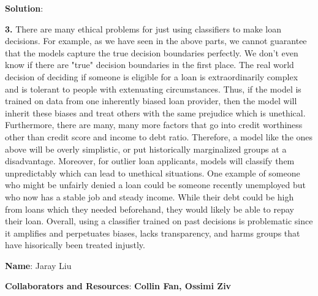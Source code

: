 \documentclass[submit]{../harvardml}
\newenvironment{solution}{
    \vspace{2mm}
    \color{black}\noindent\textbf{Solution}:
}{}
\begin{document}
\begin{solution}
\begin{tcolorbox}
        \textbf{3.} There are many ethical problems for just using classifiers to make loan decisions. For example, as we have seen in the above parts, we cannot guarantee that the models capture the true decision boundaries perfectly. We don't even know if there are "true" decision boundaries in the first place. The real world decision of deciding if someone is eligible for a loan is extraordinarily complex and is tolerant to people with extenuating circumstances. Thus, if the model is trained on data from one inherently biased loan provider, then the model will inherit these biases and treat others with the same prejudice which is unethical. Furthermore, there are many, many more factors that go into credit worthiness other than credit score and income to debt ratio. Therefore, a model like the ones above will be overly simplistic, or put historically marginalized groups at a disadvantage. Moreover, for outlier loan applicants, models will classify them unpredictably which can lead to unethical situations. One example of someone who might be unfairly denied a loan could be someone recently unemployed but who now has a stable job and steady income. While their debt could be high from loans which they needed beforehand, they would likely be able to repay their loan. Overall, using a classifier trained on past decisions is problematic since it amplifies and perpetuates biases, lacks transparency, and harms groups that have hisorically been treated injustly.
    \end{tcolorbox}
\end{solution}

\newpage
\newpage

\textbf{Name}: Jaray Liu

\textbf{Collaborators and Resources}: 
\textbf{Collin Fan, Ossimi Ziv}
\end{document}
